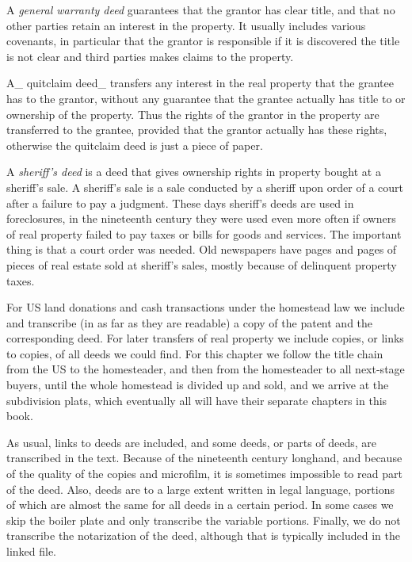 \documentclass[
  12pt,
]{book}
\begin{document}
A \emph{general warranty deed} guarantees that the grantor has clear title, and that no other parties retain an interest in the property. It usually includes various covenants, in particular that the grantor is responsible if it is discovered the title is not clear and third parties makes claims to the property.

A\_ quitclaim deed\_ transfers any interest in the real property that the grantee has to the grantor, without any guarantee that the grantee actually has title to or ownership of the property. Thus the rights of the grantor in the property are transferred to the grantee, provided that the grantor actually has these rights, otherwise the quitclaim deed is just a piece of paper.

A \emph{sheriff's deed} is a deed that gives ownership rights in property bought at a sheriff's sale. A sheriff's sale is a sale conducted by a sheriff upon order of a court after a failure to pay a judgment. These days sheriff's deeds are used in foreclosures, in the nineteenth century they were used even more often if owners of real property failed to pay taxes or bills for goods and services. The important thing is that a court order was needed. Old newspapers have pages and pages of pieces of real estate sold at sheriff's sales, mostly because of delinquent property taxes.

For US land donations and cash transactions under the homestead law we include and transcribe (in as far as they are readable) a copy of the patent and the corresponding deed. For later transfers of real property we include copies, or links to copies, of all deeds we could find. For this chapter we follow the title chain from the US to the homesteader, and then from the homesteader to all next-stage buyers, until the whole homestead is divided up and sold, and we arrive at the subdivision plats, which eventually all will have their separate chapters in this book.

As usual, links to deeds are included, and some deeds, or parts of deeds, are transcribed in the text. Because of the nineteenth century longhand, and because of the quality of the copies and microfilm, it is sometimes impossible to read part of the deed. Also, deeds are to a large extent written in legal language, portions of which are almost the same for all deeds in a certain period. In some cases we skip the boiler plate and only transcribe the variable portions. Finally, we do not transcribe the notarization of the deed, although that is typically included in the linked file.
\end{document}
